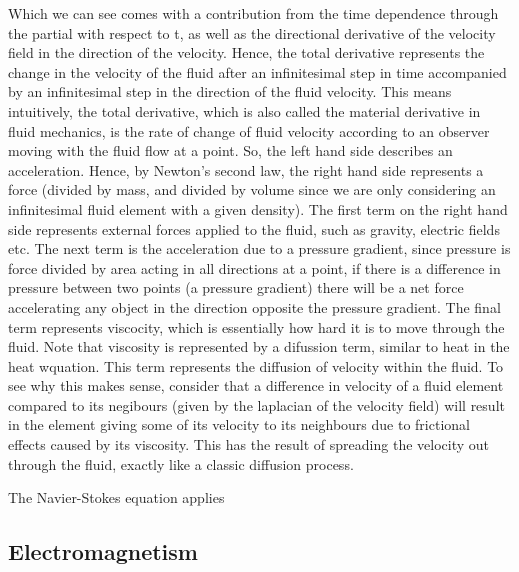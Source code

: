 Which we can see comes with a contribution from the time dependence through the partial with respect to t, as well as the directional derivative of the velocity field in the direction of the velocity. Hence, the total derivative represents the change in the velocity of the fluid after an infinitesimal step in time accompanied by an infinitesimal step in the direction of the fluid velocity. This means intuitively, the total derivative, which is also called the material derivative in fluid mechanics, is the rate of change of fluid velocity according to an observer moving with the fluid flow at a point. So, the left hand side describes an acceleration. Hence, by Newton's second law, the right hand side represents a force (divided by mass, and divided by volume since we are only considering an infinitesimal fluid element with a given density). The first term on the right hand side represents external forces applied to the fluid, such as gravity, electric fields etc. The next term is the acceleration due to a pressure gradient, since pressure is force divided by area acting in all directions at a point, if there is a difference in pressure between two points (a pressure gradient) there will be a net force accelerating any object in the direction opposite the pressure gradient. The final term represents viscocity, which is essentially how hard it is to move through the fluid. Note that viscosity is represented by a difussion term, similar to heat in the heat wquation. This term represents the diffusion of velocity within the fluid. To see why this makes sense, consider that a difference in velocity of a fluid element compared to its negibours (given by the laplacian of the velocity field) will result in the element giving some of its velocity to its neighbours due to frictional effects caused by its viscosity. This has the result of spreading the velocity out through the fluid, exactly like a classic diffusion process. 

The Navier-Stokes equation applies 


\subsection{Electromagnetism}

